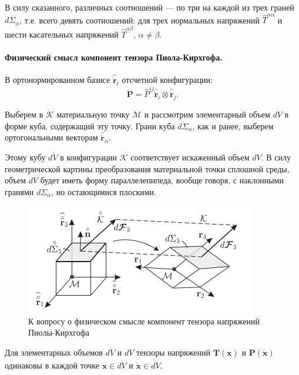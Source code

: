\begin{remark*}
	В силу сказанного, различных соотношений --- по три на каждой из трех граней $d\Sigma_{\alpha}$, т.е. всего девять соотношений: для трех нормальных напряжений $\widehat{T}^{\alpha \alpha}$ и шести касательных напряжений $\widehat{T}^{\alpha \beta}, \, \alpha \not = \beta$. 
\end{remark*}

\paragraph{Физический смысл компонент тензора Пиола-Кирхгофа.}

В ортонормированном базисе $\widehat{\mathring{\mathbf{r}}}_i$ отсчетной конфигурации:
\begin{equation*}
	\mathbf{P} = \widehat{P}^{ij} \widehat{\mathring{\mathbf{r}}}_i \otimes \widehat{\mathring{\mathbf{r}}}_j.
\end{equation*}

Выберем в $\mathring{\mathcal{K}}$ материальную точку $\mathcal{M}$ и рассмотрим элементарный объем $d\mathring{V}$ в форме куба, содержащий эту точку. Грани куба $d\mathring{\Sigma}_{\alpha}$, как и ранее, выберем ортогональными векторам $\widehat{\mathring{\mathbf{r}}}_{\alpha}$.

Этому кубу $d\mathring{V}$ в конфигурации $\mathcal{K}$ соответствует искаженный объем $dV$. В силу геометрической картины преобразования материальной точки сплошной среды, объем $dV$ будет иметь форму параллелепипеда, вообще говоря, с наклонными гранями $d\Sigma_{\alpha}$, но остающимися плоскими.

\begin{figure}[H]
	\centering
	\includegraphics[width=0.6\linewidth]{img/que18_3}
	\caption{К вопросу о физическом смысле компонент тензора напряжений Пиолы-Кирхгофа}
	\label{fig:que18_3}
\end{figure}

 Для элементарных объемов $d\mathring{V}$ и $dV$ тензоры напряжений $\mathbf{T}(\mathbf{x})$ и $\mathbf{P}(\mathring{\mathbf{x}})$ одинаковы в каждой точке $\mathbf{x} \in \overline{dV}$ и $\mathring{\mathbf{x}} \in \mathring{\overline{dV}}$. 
 
